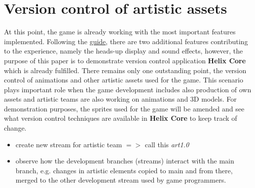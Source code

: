 \section{Version control of artistic assets}
At this point, the game is already working with the most important features implemented. Following the 
\href{https://docs.godotengine.org/en/stable/getting_started/first_2d_game/06.heads_up_display.html}{\color{blue}guide},
there are two additional features contributing to the experience, namely the heads-up display and sound effects, however,
the purpose of this paper is to demonstrate version control application \textbf{Helix Core}\textsuperscript{\texttrademark}
which is already fulfilled. There remains only one outstanding point, the version control of animations and other artistic
assets used for the game. This scenario plays important role when the game development includes also production of own
assets and artistic teams are also working on animations and 3D models. \hfill \break
For demonstration purposes, the sprites used for the game will be amended and see what version control techniques are 
available in \textbf{Helix Core}\textsuperscript{\texttrademark} to keep track of change.
\begin{itemize}
    \item create new stream for artistic team {$=>$} call this \textit{art1.0}
    \item observe how the development branches (streams) interact with the main branch, e.g. changes in artistic elements
    copied to main and from there, merged to the other development stream used by game programmers.
\end{itemize}